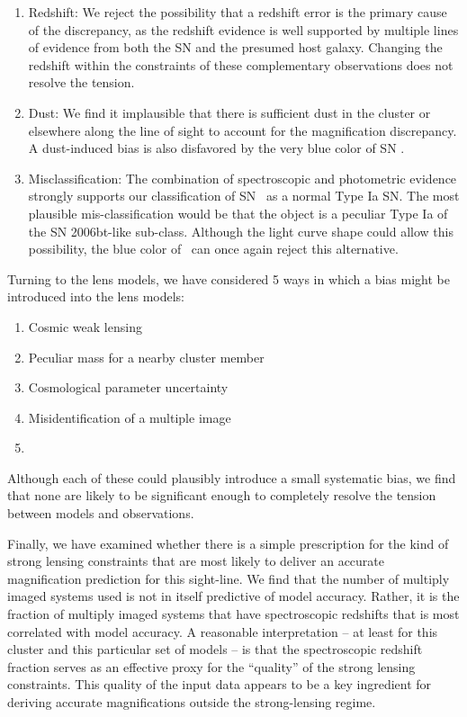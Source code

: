 \begin{enumerate}
\item Redshift: We reject the possibility that a redshift error is the primary cause
of the discrepancy, as the redshift evidence is well supported by
multiple lines of evidence from both the SN and the presumed host
galaxy. Changing the redshift within the constraints of these
complementary observations does not resolve the tension. 
\item Dust: We find
it implausible that there is sufficient dust in the cluster or
elsewhere along the line of sight to account for the magnification
discrepancy.  A dust-induced bias is also disfavored by the very blue
color of SN \tomas.
\item Misclassification: The combination of spectroscopic and
photometric evidence strongly supports our classification of
SN \tomas\ as a normal Type Ia SN.  The most plausible
mis-classification would be that the object is a peculiar Type Ia of
the SN 2006bt-like sub-class.  Although the light curve shape could
allow this possibility, the blue color of \tomas\ can once again
reject this alternative. 
\end{enumerate}

\noindent 

Turning to the lens models, we have considered 5 ways in which a bias
might be introduced into the lens models:

\begin{enumerate}
\item Cosmic weak lensing 
\item Peculiar mass for a nearby cluster member
\item Cosmological parameter uncertainty
\item Misidentification of a multiple image
\item {}
\end{enumerate}

\noindent
Although each of these could plausibly introduce a small systematic
bias, we find that none are likely to be significant enough  to completely resolve the tension between models and
observations.  

Finally, we have examined whether there is a simple prescription for
the kind of strong lensing constraints that are most likely to deliver
an accurate magnification prediction for this sight-line. 
 We find
that the number of multiply imaged systems used is not in itself
predictive of model accuracy.  Rather, it is the fraction of multiply
imaged systems that have spectroscopic redshifts that is most
correlated with model accuracy.  A reasonable interpretation 
-- at least for this cluster and this particular set of models -- is
that the spectroscopic redshift fraction serves as an effective proxy
for the ``quality'' of the strong lensing constraints. This quality of
the input data appears to be a key ingredient for deriving accurate
magnifications outside the strong-lensing regime. 

